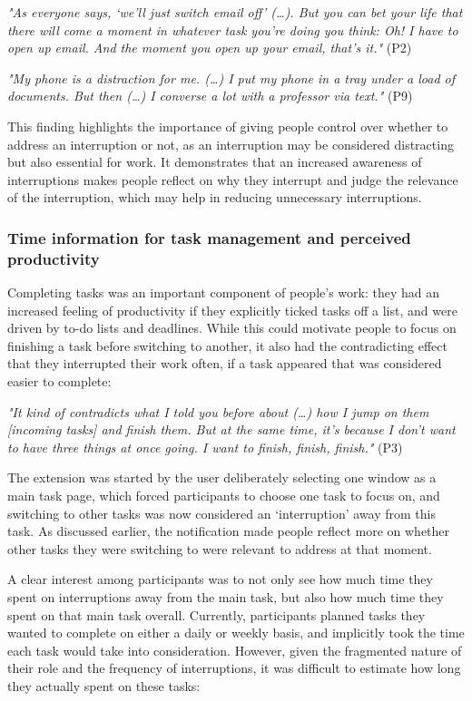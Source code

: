 \textit{"As everyone says, ‘we’ll just switch email off’ (…). But you can bet your life that there will come a moment in whatever task you’re doing you think: Oh! I have to open up email. And the moment you open up your email, that’s it."} (P2)

\textit{"My phone is a distraction for me. (…) I put my phone in a tray under a load of documents. But then (…) I converse a lot with a professor via text."} (P9)

This finding highlights the importance of giving people control over whether to address an interruption or not, as an interruption may be considered distracting but also essential for work. It demonstrates that an increased awareness of interruptions makes people reflect on why they interrupt and judge the relevance of the interruption, which may help in reducing unnecessary interruptions.

\subsubsection{Time information for task management and perceived productivity}
Completing tasks was an important component of people's work: they had an increased feeling of productivity if they explicitly ticked tasks off a list, and were driven by to-do lists and deadlines. While this could motivate people to focus on finishing a task before switching to another, it also had the contradicting effect that they interrupted their work often, if a task appeared that was considered easier to complete: 

\textit{"It kind of contradicts what I told you before about (…) how I jump on them [incoming tasks] and finish them. But at the same time, it’s because I don’t want to have three things at once going. I want to finish, finish, finish."} (P3)

The extension was started by the user deliberately selecting one window as a main task page, which forced participants to choose one task to focus on, and switching to other tasks was now considered an ‘interruption’ away from this task. As discussed earlier, the notification made people reflect more on whether other tasks they were switching to were relevant to address at that moment. 

A clear interest among participants was to not only see how much time they spent on interruptions away from the main task, but also how much time they spent on that main task overall. Currently, participants planned tasks they wanted to complete on either a daily or weekly basis, and implicitly took the time each task would take into consideration. However, given the fragmented nature of their role and the frequency of interruptions, it was difficult to estimate how long they actually spent on these tasks:

